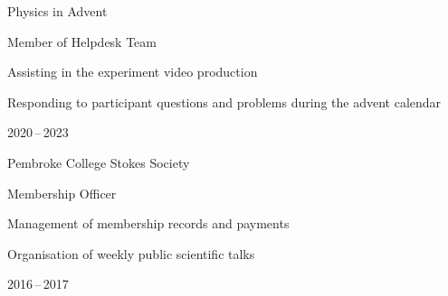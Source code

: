 



\begin{cvhonors}
  \cvhonor
    {Physics in Advent} %
    {%
      Member of Helpdesk Team\newline~
      \begin{cvitems}
        \item {Assisting in the experiment video production}
        \item {Responding to participant questions and problems during the advent calendar}
      \end{cvitems}
    } %
    {} %
    {2020\,--\,2023} %

  \cvhonor
    {Pembroke College Stokes Society} %
    {%
      Membership Officer\newline~
      \begin{cvitems}
        \item {Management of membership records and payments}
        \item {Organisation of weekly public scientific talks}
      \end{cvitems}
    } %
    {} %
    {2016\,--\,2017} %

\end{cvhonors}



